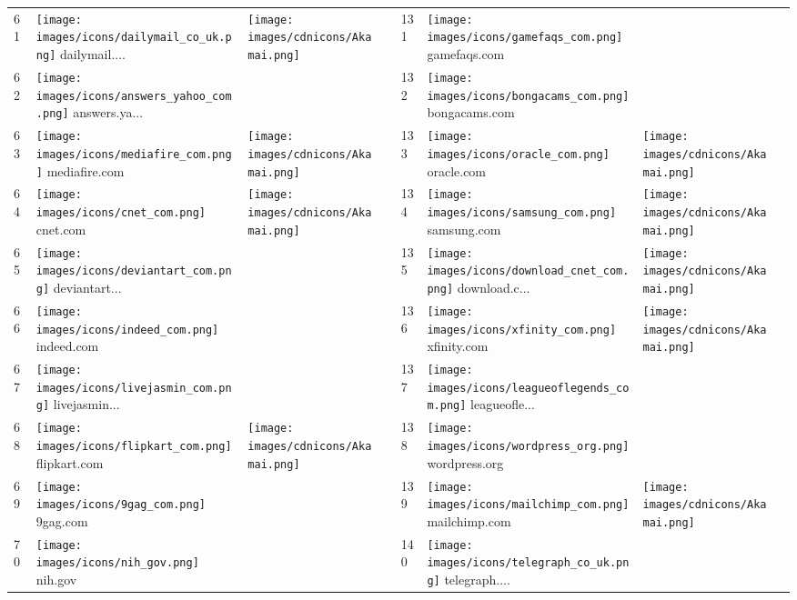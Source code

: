 \begin{table}[tbp]
\begin{tabular}{|llll|llll|}
61 & \texttt{[image: images/icons/dailymail\_co\_uk.png]} dailymail.... & \texttt{[image: images/cdnicons/Akamai.png]} & & 131 & \texttt{[image: images/icons/gamefaqs\_com.png]} gamefaqs.com & & \\
62 & \texttt{[image: images/icons/answers\_yahoo\_com.png]} answers.ya... & & & 132 & \texttt{[image: images/icons/bongacams\_com.png]} bongacams.com & & \\
63 & \texttt{[image: images/icons/mediafire\_com.png]} mediafire.com & \texttt{[image: images/cdnicons/Akamai.png]} & & 133 & \texttt{[image: images/icons/oracle\_com.png]} oracle.com & \texttt{[image: images/cdnicons/Akamai.png]} & \\
64 & \texttt{[image: images/icons/cnet\_com.png]} cnet.com & \texttt{[image: images/cdnicons/Akamai.png]} & & 134 & \texttt{[image: images/icons/samsung\_com.png]} samsung.com & \texttt{[image: images/cdnicons/Akamai.png]} & \\
65 & \texttt{[image: images/icons/deviantart\_com.png]} deviantart... & & & 135 & \texttt{[image: images/icons/download\_cnet\_com.png]} download.c... & \texttt{[image: images/cdnicons/Akamai.png]} & \\
66 & \texttt{[image: images/icons/indeed\_com.png]} indeed.com & & & 136 & \texttt{[image: images/icons/xfinity\_com.png]} xfinity.com & \texttt{[image: images/cdnicons/Akamai.png]} & \\
67 & \texttt{[image: images/icons/livejasmin\_com.png]} livejasmin... & & & 137 & \texttt{[image: images/icons/leagueoflegends\_com.png]} leagueofle... & & \\
68 & \texttt{[image: images/icons/flipkart\_com.png]} flipkart.com & \texttt{[image: images/cdnicons/Akamai.png]} & & 138 & \texttt{[image: images/icons/wordpress\_org.png]} wordpress.org & & \\
69 & \texttt{[image: images/icons/9gag\_com.png]} 9gag.com & & & 139 & \texttt{[image: images/icons/mailchimp\_com.png]} mailchimp.com & \texttt{[image: images/cdnicons/Akamai.png]} & \\
70 & \texttt{[image: images/icons/nih\_gov.png]} nih.gov & & & 140 & \texttt{[image: images/icons/telegraph\_co\_uk.png]} telegraph.... & & \\
\hline
\end{tabular}
\end{table}

